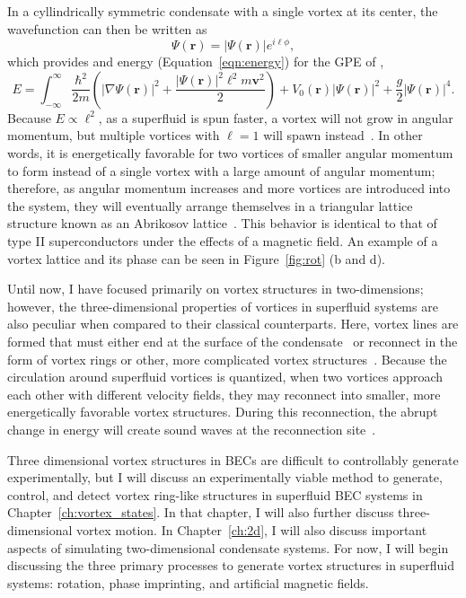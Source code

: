 In a cyllindrically symmetric condensate with a single vortex at its center, the wavefunction can then be written as
\begin{equation}
\Psi(\mathbf{r}) = |\Psi(\mathbf{r})|e^{i\ell\phi},
\end{equation}
which provides and energy (Equation~\eqref{eqn:energy}) for the GPE of ,
\begin{equation}
E = \int_{-\infty}^\infty \frac{\hbar^2}{2m}\left( |\nabla\Psi(\mathbf{r})|^2 + \frac{|\Psi(\mathbf{r})|^2\ell^2 m\mathbf{v}^2}{2}\right) + V_0(\mathbf{r})|\Psi(\mathbf{r})|^2 + \frac{g}{2}|\Psi(\mathbf{r})|^4.
\end{equation}
\noindent Because $E \propto \ell^2$, as a superfluid is spun faster, a vortex will not grow in angular momentum, but multiple vortices with $\ell = 1$ will spawn instead~\cite{pethick2002}.
In other words, it is energetically favorable for two vortices of smaller angular momentum to form instead of a single vortex with a large amount of angular momentum;
therefore, as angular momentum increases and more vortices are introduced into the system, they will eventually arrange themselves in a triangular lattice structure known as an Abrikosov lattice~\cite{abrikosov1957, fetter2001}.
This behavior is identical to that of type II superconductors under the effects of a magnetic field.
An example of a vortex lattice and its phase can be seen in Figure~\ref{fig:rot} (b and d).

Until now, I have focused primarily on vortex structures in two-dimensions; however, 
the three-dimensional properties of vortices in superfluid systems are also peculiar when compared to their classical counterparts.
Here, vortex lines are formed that must either end at the surface of the condensate~\cite{madison2000} or reconnect in the form of vortex rings or other, more complicated vortex structures~\cite{reichl2013, barenghi2014}.
Because the circulation around superfluid vortices is quantized, when two vortices approach each other with different velocity fields, they may reconnect into smaller, more energetically favorable vortex structures.
During this reconnection, the abrupt change in energy will create sound waves at the reconnection site~\cite{feynman1955}.

Three dimensional vortex structures in BECs are difficult to controllably generate experimentally, but I will discuss an experimentally viable method to generate, control, and detect vortex ring-like structures in superfluid BEC systems in Chapter~\ref{ch:vortex_states}.
In that chapter, I will also further discuss three-dimensional vortex motion.
In Chapter~\ref{ch:2d}, I will also discuss important aspects of simulating two-dimensional condensate systems.
 For now, I will begin discussing the three primary processes to generate vortex structures in superfluid systems: rotation, phase imprinting, and artificial magnetic fields.

